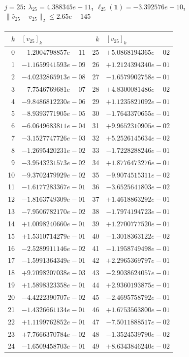 \documentclass[11pt]{article}
\begin{document}
\paragraph{$j = 25$: $\lambda_{25} = 4.388345e-11$, \quad $\ell_{25}(\mathbf{1}) = -3.392576e-10$, \quad $\|\hat{v}_{25} - v_{25}\|_2 \leq 2.65e-145$}
\begin{center}
{\footnotesize
\begin{tabular}{r@{\;\;}l@{\quad}r@{\;\;}l}
\toprule
$k$ & $[v_{25}]_k$ & $k$ & $[v_{25}]_k$ \\
\midrule
0 & $-1.2004798857e-11$ & 25 & $+5.0868194365e-02$ \\
1 & $-1.1659941593e-09$ & 26 & $+1.2124394340e-01$ \\
2 & $-4.0232865913e-08$ & 27 & $-1.6579902758e-01$ \\
3 & $-7.7546769681e-07$ & 28 & $+4.8300081486e-02$ \\
4 & $-9.8486812230e-06$ & 29 & $+1.1235821092e-01$ \\
5 & $-8.9393771905e-05$ & 30 & $-1.7643370655e-01$ \\
6 & $-6.0649683811e-04$ & 31 & $+9.9652310905e-02$ \\
7 & $-3.1527747726e-03$ & 32 & $+5.2526145634e-02$ \\
8 & $-1.2695420231e-02$ & 33 & $-1.7228288246e-01$ \\
9 & $-3.9543231573e-02$ & 34 & $+1.8776473276e-01$ \\
10 & $-9.3702479929e-02$ & 35 & $-9.9074515311e-02$ \\
11 & $-1.6177283367e-01$ & 36 & $-3.6525641803e-02$ \\
12 & $-1.8163749309e-01$ & 37 & $+1.4618863292e-01$ \\
13 & $-7.9506782170e-02$ & 38 & $-1.7974194723e-01$ \\
14 & $+1.0098240660e-01$ & 39 & $+1.2700777520e-01$ \\
15 & $+1.5310714279e-01$ & 40 & $-1.3018363122e-02$ \\
16 & $-2.5289911146e-02$ & 41 & $-1.1958749498e-01$ \\
17 & $-1.5991364349e-01$ & 42 & $+2.2965369797e-01$ \\
18 & $+9.7098207038e-03$ & 43 & $-2.9038624057e-01$ \\
19 & $+1.5898323358e-01$ & 44 & $+2.9360193875e-01$ \\
20 & $-4.4222390707e-02$ & 45 & $-2.4695758792e-01$ \\
21 & $-1.4326661134e-01$ & 46 & $+1.6753563800e-01$ \\
22 & $+1.1199762852e-01$ & 47 & $-7.5011888517e-02$ \\
23 & $+7.7666370784e-02$ & 48 & $-1.3524539790e-02$ \\
24 & $-1.6509458703e-01$ & 49 & $+8.6343846240e-02$ \\
\bottomrule
\end{tabular}
}
\end{center}
\end{document}
